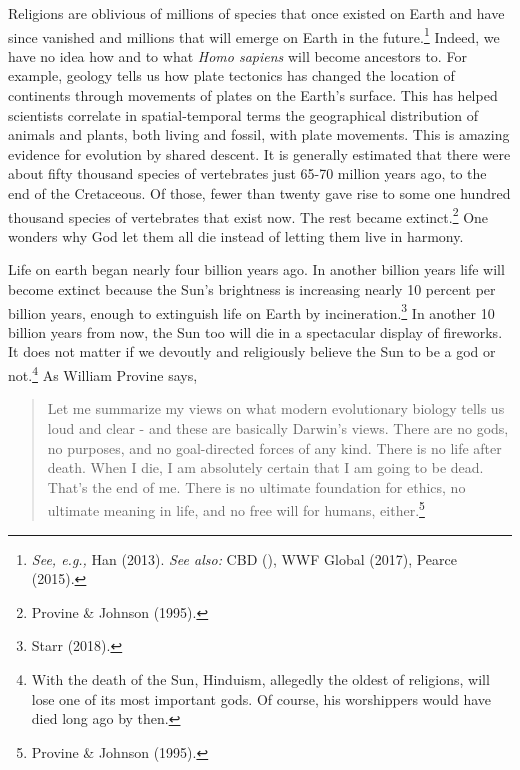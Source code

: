 \begin{multicols}{2}
Religions are oblivious of millions of species that once existed on Earth and have since vanished and millions that will emerge on Earth in the future.\footnote{\textit{See, e.g.,} Han (2013). \textit{See also:} CBD (), WWF Global (2017), Pearce (2015).} Indeed, we have no idea how and to what \textit{Homo sapiens} will become ancestors to. For example, geology tells us how plate tectonics has changed the location of continents through movements of plates on the Earth's surface. This has helped scientists correlate in spatial-temporal terms the geographical distribution of animals and plants, both living and fossil, with plate movements. This is amazing evidence for evolution by shared descent. It is generally estimated that there were about fifty thousand species of vertebrates just 65-70 million years ago, to the end of the Cretaceous. Of those, fewer than twenty gave rise to some one hundred thousand species of vertebrates that exist now. The rest became extinct.\footnote{Provine \& Johnson (1995).}  One wonders why God let them all die instead of letting them live in harmony.

Life on earth began nearly four billion years ago. In another billion years life will become extinct because the Sun's brightness is increasing nearly 10 percent per billion years, enough to extinguish life on Earth by incineration.\footnote{Starr (2018).} In another 10 billion years from now, the Sun too will die in a spectacular display of fireworks. It does not matter if we devoutly and religiously believe the Sun to be a god or not.\footnote{With the death of the Sun, Hinduism, allegedly the oldest of religions, will lose one of its most important gods. Of course, his worshippers would have died long ago by then.} As William Provine says,
\begin{quote}
Let me summarize my views on what modern evolutionary biology tells us loud and clear - and these are basically Darwin's views. There are no gods, no purposes, and no goal-directed forces of any kind. There is no life after death. When I die, I am absolutely certain that I am going to be dead. That's the end of me. There is no ultimate foundation for ethics, no ultimate meaning in life, and no free will for humans, either.\footnote{Provine \& Johnson (1995).}
\end{quote}


\end{multicols}
